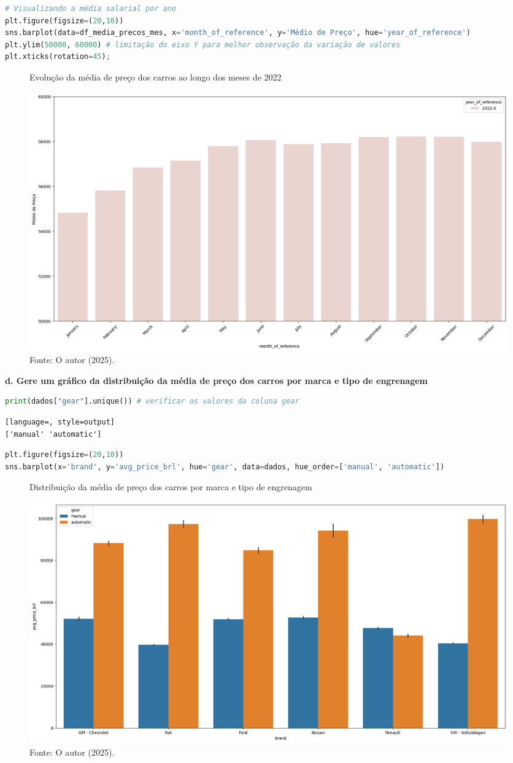 \begin{lstlisting}[language=Python, style=input]
# Visualizando a média salarial por ano
plt.figure(figsize=(20,10)) 
sns.barplot(data=df_media_precos_mes, x='month_of_reference', y='Médio de Preço', hue='year_of_reference')
plt.ylim(50000, 60000) # limitação do eixo Y para melhor observação da variação de valores
plt.xticks(rotation=45);
\end{lstlisting}
\begin{figure}[H]
\centering
\caption{Evolução da média de preço dos carros ao longo dos meses de 2022}
\includegraphics[width=1\linewidth]{apendices/fig/2_IAA002_3.png}
\caption*{Fonte: O autor (2025).}
\end{figure}



\begin{adjustwidth}{1em}{}
\textbf{d. Gere um gráfico da distribuição da média de preço dos carros por marca e tipo de engrenagem}
\end{adjustwidth}
\begin{lstlisting}[language=Python, style=input]
print(dados["gear"].unique()) # verificar os valores da coluna gear
\end{lstlisting}
\begin{lstlisting}[language=, style=output]
['manual' 'automatic']
\end{lstlisting}
\begin{lstlisting}[language=Python, style=input]
plt.figure(figsize=(20,10))
sns.barplot(x='brand', y='avg_price_brl', hue='gear', data=dados, hue_order=['manual', 'automatic'])
\end{lstlisting}
\begin{figure}[H]
\centering
\caption{Distribuição da média de preço dos carros por marca e tipo de engrenagem}
\includegraphics[width=1\linewidth]{apendices/fig/2_IAA002_4.png}
\caption*{Fonte: O autor (2025).}
\end{figure}

